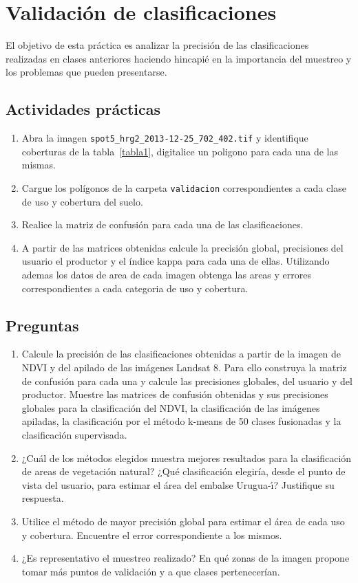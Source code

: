 \documentclass[hidelinks,12pt]{article}
\begin{document}
\newpage
\section{Validación de clasificaciones}
El objetivo de esta práctica es analizar la precisión de las clasificaciones
realizadas en clases anteriores haciendo hincapié en la importancia del muestreo
y los problemas que pueden presentarse. 

\subsection{Actividades pr\'acticas}
\begin{enumerate}
    \item Abra la imagen \texttt{spot5\_hrg2\_2013-12-25\_702\_402.tif} y
        identifique coberturas de la tabla~\ref{tabla1}, digitalice un poligono
        para cada una de las mismas.
    \item Cargue los polígonos de la carpeta \texttt{validacion} correspondientes a cada clase de
        uso y cobertura del suelo. 
    \item Realice la matriz de confusión para cada una de las clasificaciones.
    \item A partir de las matrices obtenidas calcule la precisión global,
        precisiones del usuario el productor y el índice kappa para cada una de
        ellas. Utilizando ademas los datos de area de cada imagen obtenga las
        areas y errores correspondientes a cada categoria de uso y cobertura.
\end{enumerate}
\subsection{Preguntas}
\begin{enumerate}
    \item Calcule la precisión de las clasificaciones obtenidas a partir de la
    imagen de NDVI y del apilado de las imágenes Landsat 8. Para ello
    construya la matriz de confusión para cada una y calcule  las precisiones
    globales, del usuario y del productor. Muestre las matrices de confusión
    obtenidas y sus precisiones globales para la clasificación del NDVI, la
    clasificación de las imágenes apiladas, la clasificación por el método
    k-means de 50 clases fusionadas y la clasificación supervisada.
    \item ¿Cuál de los métodos elegidos muestra mejores resultados para la
    clasificación de areas de vegetaci\'on natural? ¿Qué clasificaci\'on elegiría, desde
    el punto de vista del usuario, para estimar el área del embalse
    Urugua-\'{\i}? Justifique su respuesta.
    \item Utilice el método de mayor precisión global para estimar el área  de cada
    uso y cobertura. Encuentre el error correspondiente a los mismos.
    \item ¿Es representativo el muestreo realizado? En qué zonas de la imagen
    propone tomar más puntos de validación y a que clases pertenecerían.
\end{enumerate}
\newpage
\appendix
\end{document}
